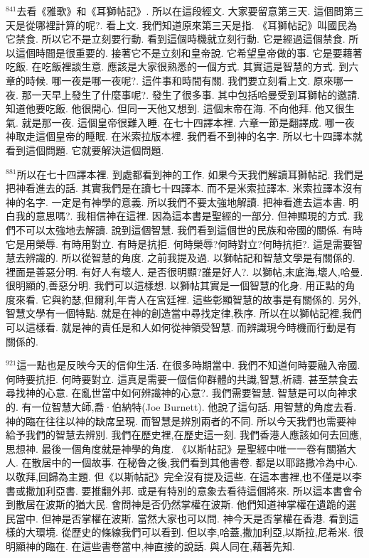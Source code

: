 \documentclass{book}
\begin{document}
$^{841}$去看《雅歌》和《耳獅帖記》.
所以在這段經文.
大家要留意第三天.
這個問第三天是從哪裡計算的呢?.
看上文.
我們知道原來第三天是指.
《耳獅帖記》叫國民為它禁食.
所以它不是立刻要行動.
看到這個時機就立刻行動.
它是經過這個禁食.
所以這個時間是很重要的.
接著它不是立刻和皇帝說.
它希望皇帝做的事.
它是要藉著吃飯.
在吃飯裡談生意.
應該是大家很熟悉的一個方式.
其實這是智慧的方式.
到六章的時候.
哪一夜是哪一夜呢?.
這件事和時間有關.
我們要立刻看上文.
原來哪一夜.
那一天早上發生了什麼事呢?.
發生了很多事.
其中包括哈曼受到耳獅帖的邀請.
知道他要吃飯.
他很開心.
但同一天他又想到.
這個末帝在海.
不向他拜.
他又很生氣.
就是那一夜.
這個皇帝很難入睡.
在七十四譯本裡.
六章一節是翻譯成.
哪一夜神取走這個皇帝的睡眠.
在米索拉版本裡.
我們看不到神的名字.
所以七十四譯本就看到這個問題.
它就要解決這個問題.

$^{881}$所以在七十四譯本裡.
到處都看到神的工作.
如果今天我們解讀耳獅帖記.
我們是把神看進去的話.
其實我們是在讀七十四譯本.
而不是米索拉譯本.
米索拉譯本沒有神的名字.
一定是有神學的意義.
所以我們不要太強地解讀.
把神看進去這本書.
明白我的意思嗎?.
我相信神在這裡.
因為這本書是聖經的一部分.
但神顯現的方式.
我們不可以太強地去解讀.
說到這個智慧.
我們看到這個世的民族和帝國的關係.
有時它是用榮辱.
有時用對立.
有時是抗拒.
何時榮辱?何時對立?何時抗拒?.
這是需要智慧去辨識的.
所以從智慧的角度.
之前我提及過.
以獅帖記和智慧文學是有關係的.
裡面是善惡分明.
有好人有壞人.
是否很明顯?誰是好人?.
以獅帖,末底海,壞人,哈曼.
很明顯的,善惡分明.
我們可以這樣想.
以獅帖其實是一個智慧的化身.
用正點的角度來看.
它與約瑟,但爾利,年青人在宮廷裡.
這些彰顯智慧的故事是有關係的.
另外,智慧文學有一個特點.
就是在神的創造當中尋找定律,秩序.
所以在以獅帖記裡,我們可以這樣看.
就是神的責任是和人如何從神領受智慧.
而辨識現今時機而行動是有關係的.

$^{921}$這一點也是反映今天的信仰生活.
在很多時期當中.
我們不知道何時要融入帝國.
何時要抗拒.
何時要對立.
這真是需要一個信仰群體的共識,智慧,祈禱.
甚至禁食去尋找神的心意.
在亂世當中如何辨識神的心意?.
我們需要智慧.
智慧是可以向神求的.
有一位智慧大師,喬·伯納特(Joe Burnett).
他說了這句話.
用智慧的角度去看.
神的臨在往往以神的缺席呈現.
而智慧是辨別兩者的不同.
所以今天我們也需要神給予我們的智慧去辨別.
我們在歷史裡,在歷史這一刻.
我們香港人應該如何去回應,思想神.
最後一個角度就是神學的角度.
《以斯帖記》是聖經中唯一一卷有關猶大人.
在散居中的一個故事.
在秘魯之後,我們看到其他書卷.
都是以耶路撒冷為中心.
以敬拜,回歸為主題.
但《以斯帖記》完全沒有提及這些.
在這本書裡,也不僅是以李書或撒加利亞書.
要推翻外邦.
或是有特別的意象去看待這個將來.
所以這本書會令到散居在波斯的猶大民.
會問神是否仍然掌權在波斯.
他們知道神掌權在遺跪的選民當中.
但神是否掌權在波斯.
當然大家也可以問.
神今天是否掌權在香港.
看到這樣的大環境.
從歷史的條線我們可以看到.
但以李,哈蓋,撒加利亞,以斯拉,尼希米.
很明顯神的臨在.
在這些書卷當中,神直接的說話.
與人同在,藉著先知.
\end{document}
